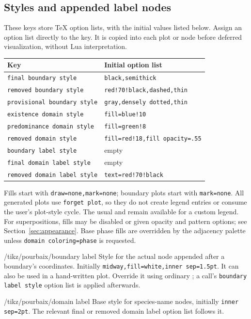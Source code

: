 \documentclass[a4paper,11pt]{ltxdoc}
\begin{document}
\subsection{Styles and appended label nodes}
These keys store TeX option lists, with the initial values listed below.
Assign an option list directly to the key. It is copied into each plot or node
before deferred visualization, without Lua interpretation.
\begin{center}
\begin{tabular}{p{6.5cm}p{7.5cm}}
Key & Initial option list\\\hline
\texttt{final boundary style} & \texttt{black,semithick}\\
\texttt{removed boundary style} & \texttt{red!70!black,dashed,thin}\\
\texttt{provisional boundary style} & \texttt{gray,densely dotted,thin}\\
\texttt{existence domain style} & \texttt{fill=blue!10}\\
\texttt{predominance domain style} & \texttt{fill=green!8}\\
\texttt{removed domain style} & \texttt{fill=red!18,fill opacity=.55}\\
\texttt{boundary label style} & empty\\
\texttt{final domain label style} & empty\\
\texttt{removed domain label style} & \texttt{text=red!70!black}
\end{tabular}
\end{center}
Fills start with \texttt{draw=none,mark=none}; boundary plots start with
\texttt{mark=none}. All generated plots use \texttt{forget plot}, so they do not
create legend entries or consume the user's plot-style cycle. The usual
 and  remain available for a custom legend.
For superpositions, fills may be disabled or given opacity and pattern options;
see Section~\ref{sec:appearance}. Base phase fills are overridden by the adjacency
palette unless \texttt{domain coloring=phase} is requested.

\begin{stylekey}{/tikz/pourbaix/boundary label}
Style for the actual node appended after a boundary's  coordinates.
Initially \texttt{midway,fill=white,inner sep=1.5pt}. It can also be used in a
hand-written plot. Override it using ordinary ; a call's
\texttt{boundary label style} option list is applied afterwards.
\end{stylekey}
\begin{stylekey}{/tikz/pourbaix/domain label}
Base style for species-name nodes, initially \texttt{inner sep=2pt}. The relevant
final or removed domain label option list follows it.
\end{stylekey}
\end{document}
